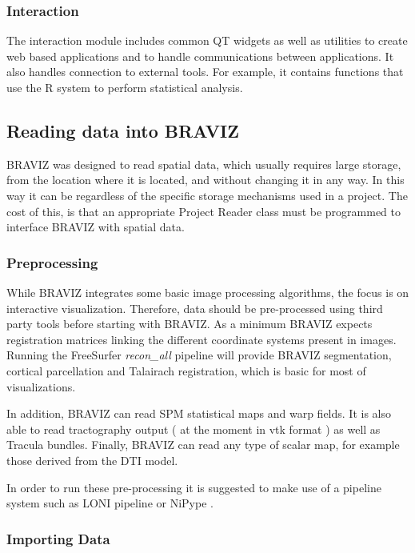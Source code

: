\documentclass[twocolumn]{svjour3}
\begin{document}
\subsubsection{Interaction}

The interaction module includes common QT widgets as well as utilities to create web based applications and to handle communications between applications. It also handles connection to external tools. For example, it contains functions that use the R system to perform statistical analysis. 

\subsection{Reading data into BRAVIZ}

BRAVIZ was designed to read spatial data, which usually requires large storage, from the location where it is located, and without changing it in any way. In this way it can be regardless of the specific storage mechanisms used in a project. The cost of this, is that an appropriate Project Reader class must be programmed to interface BRAVIZ with spatial data.

\subsubsection{Preprocessing}

While BRAVIZ integrates some basic image processing algorithms, the focus is on interactive visualization. Therefore,  data should be pre-processed using third party tools before starting with BRAVIZ. As a minimum BRAVIZ expects registration matrices linking the different coordinate systems present in images. Running the FreeSurfer \emph{recon\_all} pipeline will provide BRAVIZ segmentation, cortical parcellation and Talairach registration, which is basic for most of visualizations. 

In addition, BRAVIZ can read SPM statistical maps and warp fields. It is also able to read tractography output ( at the moment in vtk format ) as well as Tracula bundles. Finally, BRAVIZ can read any type of scalar map, for example those derived from the DTI model.

In order to run these pre-processing it is suggested to make use of a pipeline system such as LONI pipeline \cite{} or NiPype \cite{}.

\subsubsection{Importing Data}
\end{document}
